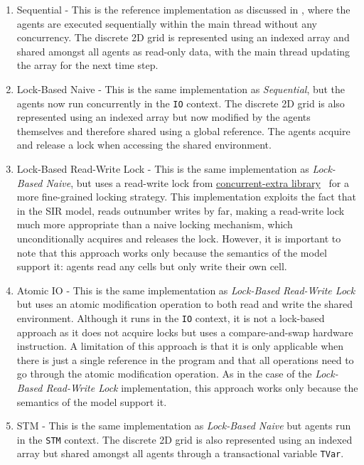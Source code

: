 \begin{enumerate}
	\item Sequential - This is the reference implementation as discussed in \cite{thaler_pure_2018}, where the agents are executed sequentially within the main thread without any concurrency. The discrete 2D grid is represented using an indexed array \cite{array_hackage} and shared amongst all agents as read-only data, with the main thread updating the array for the next time step.
		
	\item Lock-Based Naive - This is the same implementation as \textit{Sequential}, but the agents now run concurrently in the \texttt{IO} context.  The discrete 2D grid is also represented using an indexed array but now modified by the agents themselves and therefore shared using a global reference. The agents acquire and release a lock when accessing the shared environment.

	\item Lock-Based Read-Write Lock - This is the same implementation as \textit{Lock-Based Naive}, but uses a read-write lock from \href{http://hackage.haskell.org/package/concurrent-extra}{concurrent-extra library}~\cite{concurrent_extra_library} for a more fine-grained locking strategy. This implementation exploits the fact that in the SIR model, reads outnumber writes by far, making a read-write lock much more appropriate than a naive locking mechanism, which unconditionally acquires and releases the lock. However, it is important to note that this approach works only because the semantics of the model support it: agents read any cells but only write their own cell. 
	
	\item Atomic IO - This is the same implementation as \textit{Lock-Based Read-Write Lock} but uses an atomic modification operation to both read and write the shared environment. Although it runs in the \texttt{IO} context, it is not a lock-based approach as it does not acquire locks but uses a compare-and-swap hardware instruction. A limitation of this approach is that it is only applicable when there is just a single reference in the program and that all operations need to go through the atomic modification operation. As in the case of the \textit{Lock-Based Read-Write Lock} implementation, this approach works only because the semantics of the model support it. 
	
	\item STM - This is the same implementation as \textit{Lock-Based Naive} but agents run in the \texttt{STM} context. The discrete 2D grid is also represented using an indexed array but shared amongst all agents through a transactional variable \texttt{TVar}.
	
\end{enumerate}

